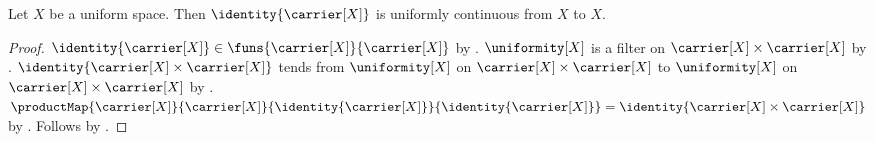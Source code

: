 \begin{theorem}\label{identity_is_uniformly_continuous}
    Let $X$ be a uniform space.
    Then $\identity{\carrier[X]}$ is uniformly continuous from $X$ to $X$.
\end{theorem}
\begin{proof}
    $\identity{\carrier[X]}\in
        \funs{\carrier[X]}{\carrier[X]}$ by .
    $\uniformity[X]$ is a filter on
        $\carrier[X]\times\carrier[X]$ by .
    $\identity{\carrier[X]\times\carrier[X]}$ tends from
        $\uniformity[X]$ on $\carrier[X]\times\carrier[X]$ to
        $\uniformity[X]$ on $\carrier[X]\times\carrier[X]$ by
        .
    $\productMap{\carrier[X]}{\carrier[X]}{
        \identity{\carrier[X]}}{\identity{\carrier[X]}}
        =\identity{\carrier[X]\times\carrier[X]}$ by
        .
    Follows by .
\end{proof}

